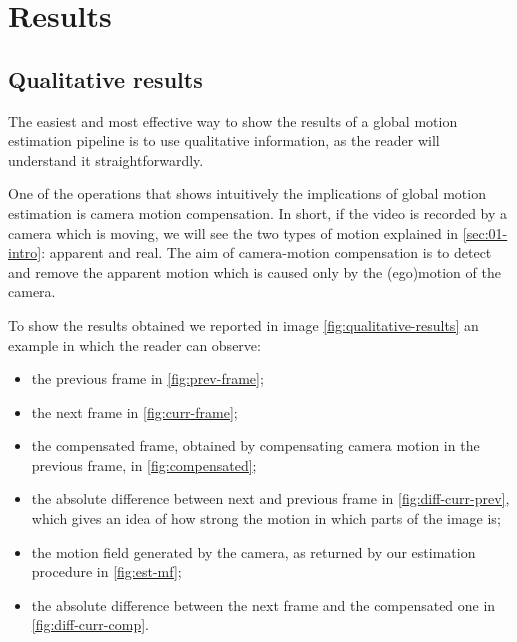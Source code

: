 \section{Results}
\label{sec:04-results}

\subsection{Qualitative results}
The easiest and most effective way to show the results of a global motion estimation pipeline is to use qualitative information, as  the reader will understand it straightforwardly.

One of the operations that shows intuitively the implications of global motion estimation is camera motion compensation. 
In short, if the video is recorded by a camera which is moving, we will see the two types of motion explained in \cref{sec:01-intro}: apparent and real. The aim of camera-motion compensation is to detect and remove the apparent motion which is caused only by the (ego)motion of the camera.

To show the results obtained we reported in image \cref{fig:qualitative-results} an example in which the reader can observe:
\begin{itemize}
    \item the previous frame in \cref{fig:prev-frame};
    \item the next frame in \cref{fig:curr-frame};
    \item the compensated frame, obtained by compensating camera motion in the previous frame, in \cref{fig:compensated};
    \item the absolute difference between next and previous frame in \cref{fig:diff-curr-prev}, which gives an idea of how strong the motion in which parts of the image is;
    \item the motion field generated by the camera, as returned by our estimation procedure in \cref{fig:est-mf};
    \item the absolute difference between the next frame and the compensated one in \cref{fig:diff-curr-comp}.
\end{itemize}

